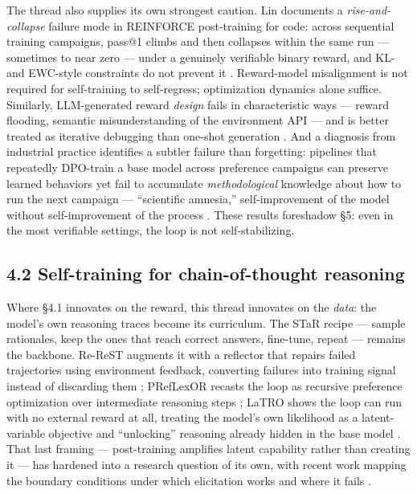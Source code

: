 \documentclass[
  11pt,
]{article}
\begin{document}
The thread also supplies its own strongest caution. Lin documents a
\emph{rise-and-collapse} failure mode in REINFORCE post-training for
code: across sequential training campaigns, pass@1 climbs and then
collapses within the same run --- sometimes to near zero --- under a
genuinely verifiable binary reward, and KL- and EWC-style constraints do
not prevent it \citep{lin2026self}. Reward-model misalignment is not
required for self-training to self-regress; optimization dynamics alone
suffice. Similarly, LLM-generated reward \emph{design} fails in
characteristic ways --- reward flooding, semantic misunderstanding of
the environment API --- and is better treated as iterative debugging
than one-shot generation \citep{wang2026when}. And a diagnosis from
industrial practice identifies a subtler failure than forgetting:
pipelines that repeatedly DPO-train a base model across preference
campaigns can preserve learned behaviors yet fail to accumulate
\emph{methodological} knowledge about how to run the next campaign ---
``scientific amnesia,'' self-improvement of the model without
self-improvement of the process \citep{lin2026repeated}. These results
foreshadow §5: even in the most verifiable settings, the loop is not
self-stabilizing.

\subsection{4.2 Self-training for chain-of-thought
reasoning}\label{self-training-for-chain-of-thought-reasoning}

Where §4.1 innovates on the reward, this thread innovates on the
\emph{data}: the model's own reasoning traces become its curriculum. The
STaR recipe --- sample rationales, keep the ones that reach correct
answers, fine-tune, repeat --- remains the backbone. Re-ReST augments it
with a reflector that repairs failed trajectories using environment
feedback, converting failures into training signal instead of discarding
them \citep{dou2024re}; PRefLexOR recasts the loop as recursive
preference optimization over intermediate reasoning steps
\citep{buehler2024preflexor}; LaTRO shows the loop can run with no
external reward at all, treating the model's own likelihood as a
latent-variable objective and ``unlocking'' reasoning already hidden in
the base model \citep{chen2024language}. That last framing ---
post-training amplifies latent capability rather than creating it ---
has hardened into a research question of its own, with recent work
mapping the boundary conditions under which elicitation works and where
it fails \citep{javadov2026neureasoner}.
\end{document}
